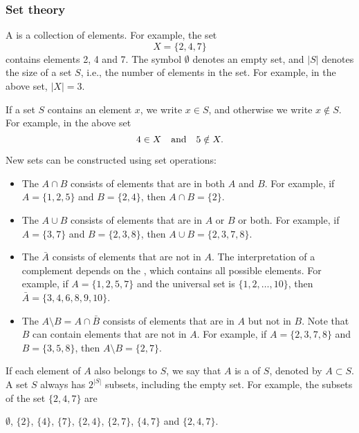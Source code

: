 \subsubsection{Set theory}


A  is a collection of elements.
For example, the set
\[X=\{2,4,7\}\]
contains elements 2, 4 and 7.
The symbol $\emptyset$ denotes an empty set,
and $|S|$ denotes the size of a set $S$,
i.e., the number of elements in the set.
For example, in the above set, $|X|=3$.

If a set $S$ contains an element $x$,
we write $x \in S$,
and otherwise we write $x \notin S$.
For example, in the above set
\[4 \in X \hspace{10px}\textrm{and}\hspace{10px} 5 \notin X.\]

\begin{samepage}
New sets can be constructed using set operations:
\begin{itemize}
\item The  $A \cap B$ consists of elements
that are in both $A$ and $B$.
For example, if $A=\{1,2,5\}$ and $B=\{2,4\}$,
then $A \cap B = \{2\}$.
\item The  $A \cup B$ consists of elements
that are in $A$ or $B$ or both.
For example, if $A=\{3,7\}$ and $B=\{2,3,8\}$,
then $A \cup B = \{2,3,7,8\}$.
\item The  $\bar A$ consists of elements
that are not in $A$.
The interpretation of a complement depends on
the , which contains all possible elements.
For example, if $A=\{1,2,5,7\}$ and the universal set is
$\{1,2,\ldots,10\}$, then $\bar A = \{3,4,6,8,9,10\}$.
\item The  $A \setminus B = A \cap \bar B$
consists of elements that are in $A$ but not in $B$.
Note that $B$ can contain elements that are not in $A$.
For example, if $A=\{2,3,7,8\}$ and $B=\{3,5,8\}$,
then $A \setminus B = \{2,7\}$.
\end{itemize}
\end{samepage}

If each element of $A$ also belongs to $S$,
we say that $A$ is a  of $S$,
denoted by $A \subset S$.
A set $S$ always has $2^{|S|}$ subsets,
including the empty set.
For example, the subsets of the set $\{2,4,7\}$ are
\begin{center}
$\emptyset$,
$\{2\}$, $\{4\}$, $\{7\}$, $\{2,4\}$, $\{2,7\}$, $\{4,7\}$ and $\{2,4,7\}$.
\end{center}


